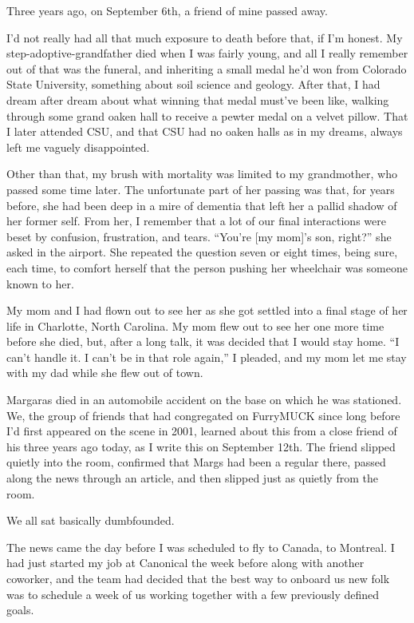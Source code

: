 
Three years ago, on September 6th, a friend of mine passed away.

I'd not really had all that much exposure to death before that, if I'm honest. My step-adoptive-grandfather died when I was fairly young, and all I really remember out of that was the funeral, and inheriting a small medal he'd won from Colorado State University, something about soil science and geology. After that, I had dream after dream about what winning that medal must've been like, walking through some grand oaken hall to receive a pewter medal on a velvet pillow. That I later attended CSU, and that CSU had no oaken halls as in my dreams, always left me vaguely disappointed.

Other than that, my brush with mortality was limited to my grandmother, who passed some time later. The unfortunate part of her passing was that, for years before, she had been deep in a mire of dementia that left her a pallid shadow of her former self. From her, I remember that a lot of our final interactions were beset by confusion, frustration, and tears. ``You're {[}my mom{]}'s son, right?'' she asked in the airport. She repeated the question seven or eight times, being sure, each time, to comfort herself that the person pushing her wheelchair was someone known to her.

My mom and I had flown out to see her as she got settled into a final stage of her life in Charlotte, North Carolina. My mom flew out to see her one more time before she died, but, after a long talk, it was decided that I would stay home. ``I can't handle it. I can't be in that role again,'' I pleaded, and my mom let me stay with my dad while she flew out of town.

Margaras died in an automobile accident on the base on which he was stationed. We, the group of friends that had congregated on FurryMUCK since long before I'd first appeared on the scene in 2001, learned about this from a close friend of his three years ago today, as I write this on September 12th. The friend slipped quietly into the room, confirmed that Margs had been a regular there, passed along the news through an article, and then slipped just as quietly from the room.

We all sat basically dumbfounded.

The news came the day before I was scheduled to fly to Canada, to Montreal. I had just started my job at Canonical the week before along with another coworker, and the team had decided that the best way to onboard us new folk was to schedule a week of us working together with a few previously defined goals.

